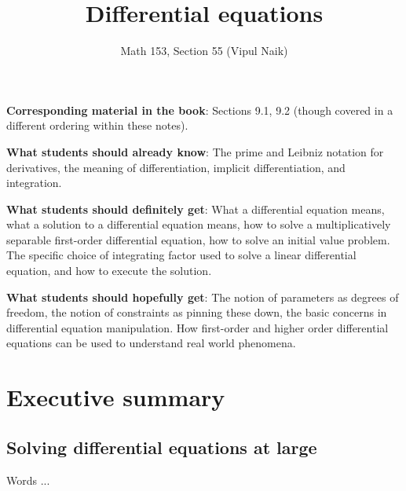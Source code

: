 \documentclass{amsart}
\title{Differential equations}
\author{Math 153, Section 55 (Vipul Naik)}
\begin{document}
\maketitle

{\bf Corresponding material in the book}: Sections 9.1, 9.2 (though
covered in a different ordering within these notes).

{\bf What students should already know}: The prime and Leibniz
notation for derivatives, the meaning of differentiation, implicit
differentiation, and integration.

{\bf What students should definitely get}: What a differential
equation means, what a solution to a differential equation means, how
to solve a multiplicatively separable first-order differential
equation, how to solve an initial value problem. The specific choice
of integrating factor used to solve a linear differential equation,
and how to execute the solution.

{\bf What students should hopefully get}: The notion of parameters as
degrees of freedom, the notion of constraints as pinning these down,
the basic concerns in differential equation manipulation. How
first-order and higher order differential equations can be used to
understand real world phenomena.

\section*{Executive summary}

\subsection{Solving differential equations at large}

Words ...
\end{document}
